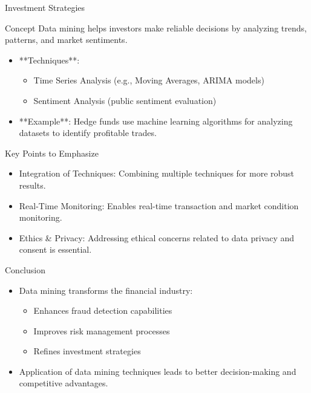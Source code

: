 \documentclass[aspectratio=169]{beamer}
\begin{document}
\begin{frame}{Investment Strategies}
    \begin{block}{Concept}
        Data mining helps investors make reliable decisions by analyzing trends, patterns, and market sentiments.
    \end{block}
    \begin{itemize}
        \item **Techniques**:
        \begin{itemize}
            \item Time Series Analysis (e.g., Moving Averages, ARIMA models)
            \item Sentiment Analysis (public sentiment evaluation)
        \end{itemize}
        \item **Example**: Hedge funds use machine learning algorithms for analyzing datasets to identify profitable trades.
    \end{itemize}
\end{frame}

\begin{frame}{Key Points to Emphasize}
    \begin{itemize}
        \item Integration of Techniques: Combining multiple techniques for more robust results.
        \item Real-Time Monitoring: Enables real-time transaction and market condition monitoring.
        \item Ethics & Privacy: Addressing ethical concerns related to data privacy and consent is essential.
    \end{itemize}
\end{frame}

\begin{frame}{Conclusion}
    \begin{itemize}
        \item Data mining transforms the financial industry:
        \begin{itemize}
            \item Enhances fraud detection capabilities
            \item Improves risk management processes
            \item Refines investment strategies
        \end{itemize}
        \item Application of data mining techniques leads to better decision-making and competitive advantages.
    \end{itemize}
\end{frame}
\end{document}
